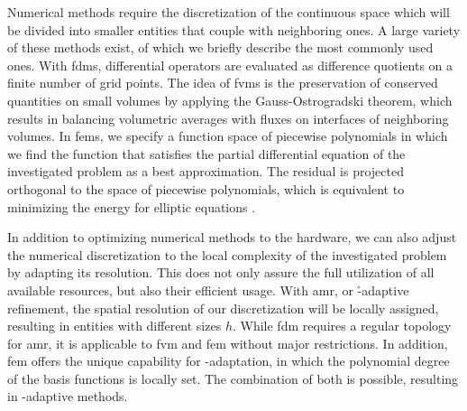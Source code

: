 Numerical methods require the discretization of the continuous space which will be divided into smaller entities that couple with neighboring ones. A large variety of these methods exist, of which we briefly describe the most commonly used ones.
With \glspl{fdm}, differential operators are evaluated as difference quotients on a finite number of grid points. %
The idea of \glspl{fvm} is the preservation of conserved quantities on small volumes by applying the Gauss-Ostrogradski theorem, which results in balancing volumetric averages with fluxes on interfaces of neighboring volumes.
In \glspl{fem}, we specify a function space of piecewise polynomials in which we find the function that satisfies the partial differential equation of the investigated problem as a best approximation.
The residual is projected orthogonal to the space of piecewise polynomials, which is equivalent to minimizing the energy for elliptic equations \parencite{brenner2008}.


In addition to optimizing numerical methods to the hardware, we can also adjust the numerical discretization to the local complexity of the investigated problem by adapting its resolution.
This does not only assure the full utilization of all available resources, but also their efficient usage.
With \gls{amr}, or \h-adaptive refinement, the spatial resolution of our discretization will be locally assigned, resulting in entities with different sizes $h$. While \gls{fdm} requires a regular topology for \gls{amr}, it is applicable to \gls{fvm} and \gls{fem} without major restrictions. In addition, \gls{fem} offers the unique capability for \p-adaptation, in which the polynomial degree of the basis functions is locally set. The combination of both is possible, resulting in \hp-adaptive methods.

